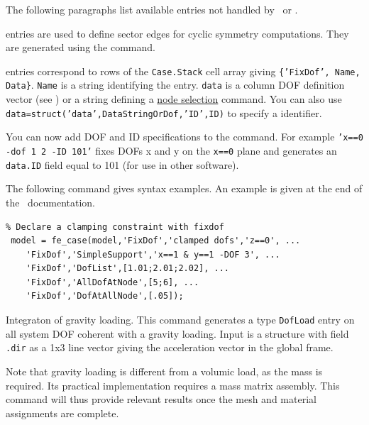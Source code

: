 
The following paragraphs list available entries not handled by \feload\ or \upcom.


\rz{} entries are used to define sector edges for cyclic symmetry computations. They are generated using the  command.


 entries correspond to rows of the {\tt Case.Stack} cell array giving {\tt \{'FixDof', Name, Data\}}. {\tt Name} is a string identifying the entry. {\tt data} is a column DOF definition vector (see ) or a string defining a \hyperlink{findnode}{node selection} command. You can also use \\{\tt data=struct('data',DataStringOrDof,'ID',ID)} to specify a identifier.

You can now add DOF and ID specifications to the  command. For example {\tt 'x==0 -dof 1 2 -ID 101'} fixes DOFs x and y on the {\tt x==0} plane and generates an {\tt data.ID} field equal to 101 (for use in other software).

The following command gives syntax examples. An example is given at the end of the \fecase\ documentation.

\begin{verbatim}
% Declare a clamping constraint with fixdof
 model = fe_case(model,'FixDof','clamped dofs','z==0', ...
    'FixDof','SimpleSupport','x==1 & y==1 -DOF 3', ...
    'FixDof','DofList',[1.01;2.01;2.02], ...
    'FixDof','AllDofAtNode',[5;6], ...
    'FixDof','DofAtAllNode',[.05]);
\end{verbatim}



Integraton of gravity loading. This command generates a type {\tt DofLoad} entry on all system DOF coherent with a gravity loading.
Input is a structure with field {\tt .dir} as a 1x3 line vector giving the acceleration vector in the global frame.

Note that gravity loading is different from a volumic load, as the mass is required. Its practical implementation requires a mass matrix assembly. This command will thus provide relevant results once the mesh and material assignments are complete.

